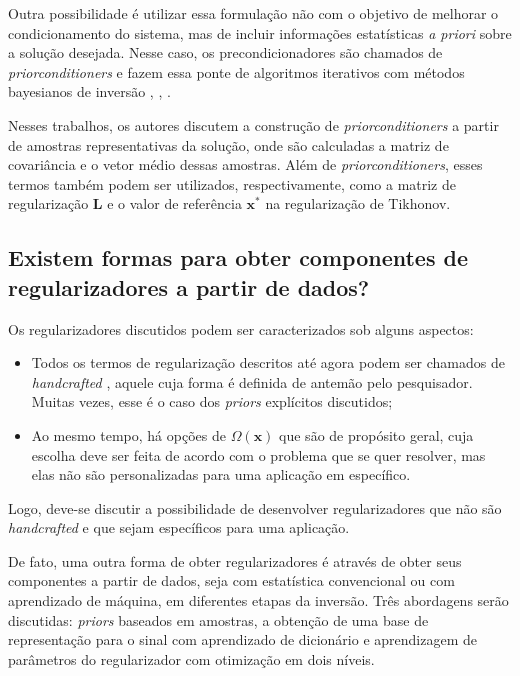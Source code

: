 Outra possibilidade é utilizar essa formulação não com o objetivo de melhorar o condicionamento do sistema, mas de incluir informações estatísticas \textit{a priori} sobre a solução desejada. Nesse caso, os precondicionadores são chamados de \textit{priorconditioners} e fazem essa ponte de algoritmos iterativos com métodos bayesianos de inversão \cite[Capítulo 6]{calvetti2007introduction},  \cite{Calvetti2005},  \cite[pág. 8]{Gazzola2018}. 

Nesses trabalhos, os autores discutem a construção de \textit{priorconditioners} a partir de amostras representativas da solução, onde são calculadas a matriz de covariância e o vetor médio dessas amostras. Além de \textit{priorconditioners}, esses termos também podem ser utilizados, respectivamente, como a matriz de regularização $\mathbf{L}$ e o valor de referência $\mathbf{x}^*$ na regularização de Tikhonov.

\subsection{Existem formas para obter componentes de regularizadores a partir de dados?}\label{sec:dados}

Os regularizadores discutidos podem ser caracterizados sob alguns aspectos:
\begin{itemize}
\item Todos os termos de regularização descritos até agora podem ser chamados de \textit{handcrafted} \cite[págs. 26, 38]{Arridge2019}, aquele cuja forma é definida de antemão pelo pesquisador. Muitas vezes, esse é o caso dos \textit{priors} explícitos discutidos;
\item Ao mesmo tempo, há opções de $\Omega(\mathbf{x})$ que são de propósito geral, cuja escolha deve ser feita de acordo com o problema que se quer resolver, mas elas não são personalizadas para uma aplicação em específico. 
\end{itemize}
Logo, deve-se discutir a possibilidade de desenvolver regularizadores que não são \textit{handcrafted} e que sejam específicos para uma aplicação. 

De fato, uma outra forma de obter regularizadores é através de obter seus componentes a partir de dados, seja com estatística convencional ou com aprendizado de máquina, em diferentes etapas da inversão. Três abordagens serão discutidas: \textit{priors} baseados em amostras, a obtenção de uma base de representação para o sinal com aprendizado de dicionário e aprendizagem de parâmetros do regularizador com otimização em dois níveis. 


